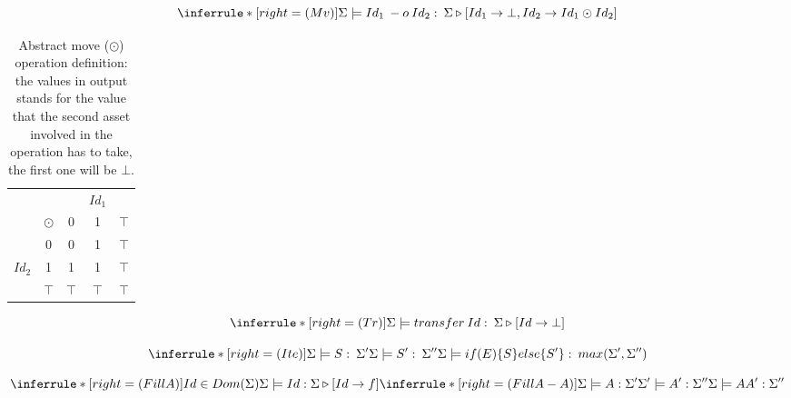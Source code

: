 \documentclass[11pt]{article} %
\begin{document}
\medskip

\[
\inferrule*[right=(Mv)]
{\\}
{\Sigma \models Id_1 \: -o \: Id_2 : \: \Sigma \triangleright [Id_1 \rightarrow \bot, Id_2 \rightarrow Id_1 \odot Id_2]}
\]

\medskip

\begin{table}[]
\begin{center}
\begin{tabular}{cc|ccc}
&          &     & $Id_1$ &       \\
&$ \odot $ & 0   & 1   & $\top$ \\ \hline
&0                    & 0   & 1   & $\top$                 \\
$Id_2$ &1                    & 1   & 1   & $\top$                \\ 
&$\top$ & $\top$ & $\top$ & $\top$             
\end{tabular}
\caption{Abstract move ($\odot$) operation definition: the values in output stands for the value that the second asset involved in the operation has to take, the first one will be $\bot$.}
\label{tab:abstMove}
\end{center}
\end{table}

\medskip

\[
\inferrule*[right=(Tr)]
{\\}
{\Sigma \models transfer \: Id : \: \Sigma \triangleright [Id\rightarrow \bot]}
\]

\medskip

\[
\inferrule*[right=(Ite)]
{\Sigma \models S : \: \Sigma' \\ \Sigma \models S': \: \Sigma''}
{\Sigma \models if (E) \{ S\} else\{S' \} : \: max(\Sigma',\Sigma'')}
\]

\medskip

\[
\inferrule*[right=(FillA)]
{Id \in Dom(\Sigma)}
{\Sigma \models Id : \Sigma \triangleright [Id\rightarrow f]}
\inferrule*[right=(FillA-A)]
{\Sigma \models A : \Sigma' \\ \Sigma'\models A':\Sigma'' }
{\Sigma \models A A' : \Sigma''}
\]

\medskip
\end{document}
